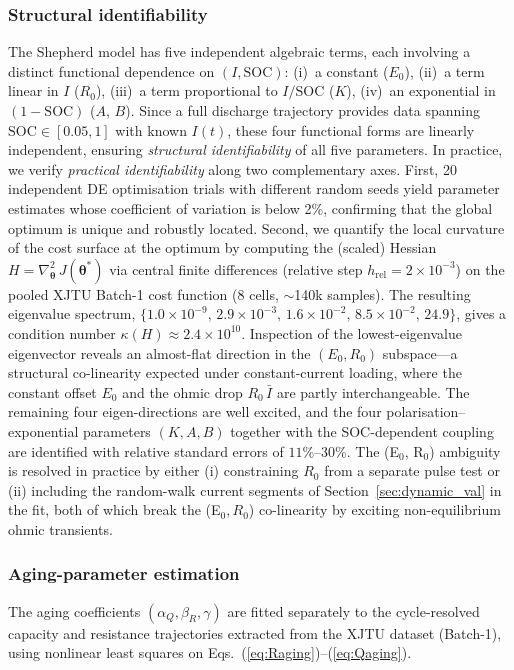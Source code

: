 \documentclass[5p,times,number]{elsarticle}
\newcommand{\secref}[1]{\hyperref[#1]{\textup{Section~\ref*{#1}}}}
\newcommand{\eqnsref}[2]{\hyperref[#1]{\textup{Eqs.~(\ref*{#1})}}--\hyperref[#2]{\textup{(\ref*{#2})}}}
\def\secref#1{Section~\ref{#1}}
\def\eqnsref#1#2{Eqs.~(\ref{#1})--(\ref{#2})}
\begin{document}
\subsubsection{Structural identifiability}
The Shepherd model has five independent algebraic terms, each involving a distinct functional dependence on $(I, \mathrm{SOC})$:
(i)~a constant ($E_0$),
(ii)~a term linear in $I$ ($R_0$),
(iii)~a term proportional to $I/\mathrm{SOC}$ ($K$),
(iv)~an exponential in $(1-\mathrm{SOC})$ ($A$, $B$).
Since a full discharge trajectory provides data spanning $\mathrm{SOC} \in [0.05, 1]$ with known $I(t)$, these four functional forms are linearly independent, ensuring \emph{structural identifiability} of all five parameters.
In practice, we verify \emph{practical identifiability} along two complementary axes.
First, 20 independent DE optimisation trials with different random seeds yield parameter estimates whose coefficient of variation is below 2\%, confirming that the global optimum is unique and robustly located.
Second, we quantify the local curvature of the cost surface at the optimum by computing the (scaled) Hessian $H = \nabla_{\boldsymbol{\theta}}^{2}\,J(\boldsymbol{\theta}^{*})$ via central finite differences (relative step $h_{\mathrm{rel}} = 2\times 10^{-3}$) on the pooled XJTU Batch-1 cost function (8 cells, $\sim$140k samples). The resulting eigenvalue spectrum, $\{1.0\!\times\!10^{-9},\, 2.9\!\times\!10^{-3},\, 1.6\!\times\!10^{-2},\, 8.5\!\times\!10^{-2},\, 24.9\}$, gives a condition number $\kappa(H) \approx 2.4 \times 10^{10}$. Inspection of the lowest-eigenvalue eigenvector reveals an almost-flat direction in the $(E_0, R_0)$ subspace---a structural co-linearity expected under constant-current loading, where the constant offset $E_0$ and the ohmic drop $R_0\,\bar{I}$ are partly interchangeable. The remaining four eigen-directions are well excited, and the four polarisation--exponential parameters $(K, A, B)$ together with the SOC-dependent coupling are identified with relative standard errors of $11\%$--$30\%$. The (E$_0$, R$_0$) ambiguity is resolved in practice by either (i) constraining $R_0$ from a separate pulse test or (ii) including the random-walk current segments of \secref{sec:dynamic_val} in the fit, both of which break the (E$_0, R_0$) co-linearity by exciting non-equilibrium ohmic transients.

\subsubsection{Aging-parameter estimation}
The aging coefficients $(\alpha_Q, \beta_R, \gamma)$ are fitted separately to the cycle-resolved capacity and resistance trajectories extracted from the XJTU dataset (Batch-1), using nonlinear least squares on \eqnsref{eq:Raging}{eq:Qaging}.
\end{document}
